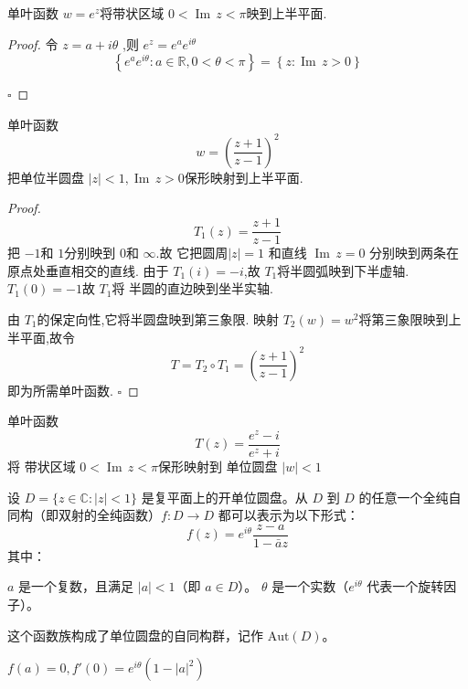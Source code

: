 \documentclass[../../复变函数.tex]{subfiles}
\begin{document}
\begin{example}
    单叶函数 \(  w= e^{z}  \)将带状区域 \(  0< \operatorname{Im}\,z < \pi   \)映到上半平面.  
\end{example}
\begin{proof}
    令 \(  z= a+ i \theta   \) ,则 \(  e^{z}= e^{a}e^{i \theta }  \) \[
    \left\{ e^{a}e^{i \theta }:a \in \mathbb{R} ,0<  \theta < \pi  \right\}= \left\{ z:\operatorname{Im}\,z> 0  \right\}
    \]

    \hfill $\square$
\end{proof}
\begin{example}[]
    单叶函数 \[
    w= \left( \frac{z+ 1 }{z-1 }  \right)^{2} 
    \]把单位半圆盘 \(  \left| z \right|< 1,\operatorname{Im}\,z> 0   \)保形映射到上半平面. 
\end{example}
\begin{proof}
    \[
    T_1\left( z \right) = \frac{z+ 1 }{z-1 } 
    \]把 \(  -1  \)和 \(  1  \)分别映到 \(  0  \)和 \(  \infty  \).故 它把圆周\(  \left| z \right|= 1   \) 和直线 \(  \operatorname{Im}\,z= 0  \) 分别映到两条在原点处垂直相交的直线.     
    由于 \(  T_1\left( i \right)= -i   \),故 \(  T_1  \)将半圆弧映到下半虚轴.  \(  T_1\left( 0 \right)= -1   \)故 \(  T_1  \)将 半圆的直边映到坐半实轴.  
    
    由 \(  T_1  \)的保定向性,它将半圆盘映到第三象限. 映射 \(  T_2\left( w \right)= w^{2}   \)将第三象限映到上半平面,故令 \[
    T= T_2\circ T_1= \left( \frac{z+ 1 }{z-1 }  \right)^{2} 
    \]即为所需单叶函数.  
    \hfill $\square$
\end{proof}

\begin{example}
    单叶函数 \[
    T\left( z \right)= \frac{e^{z}-i }{e^{z}+ i }  
    \]将 带状区域 \(  0< \operatorname{Im}\,z< \pi   \)保形映射到 单位圆盘 \(  \left| w \right|< 1   \)  
\end{example}

\begin{theorem}
    设 $D = \{z \in \mathbb{C} : |z| < 1\}$ 是复平面上的开单位圆盘。从 $D$ 到 $D$ 的任意一个全纯自同构（即双射的全纯函数）$f: D \to D$ 都可以表示为以下形式：
$$f(z) = e^{i\theta} \frac{z-a}{1-\bar{a}z}$$
其中：

$a$ 是一个复数，且满足 $|a| < 1$（即 $a \in D$）。
$\theta$ 是一个实数（$e^{i\theta}$ 代表一个旋转因子）。

这个函数族构成了单位圆盘的自同构群，记作 $\text{Aut}(D)$。
\end{theorem}

\begin{remark}
    \(  f\left( a \right)= 0 , f'(0) = e^{i\theta} (1-|a|^2)\) 
\end{remark}
\end{document}
